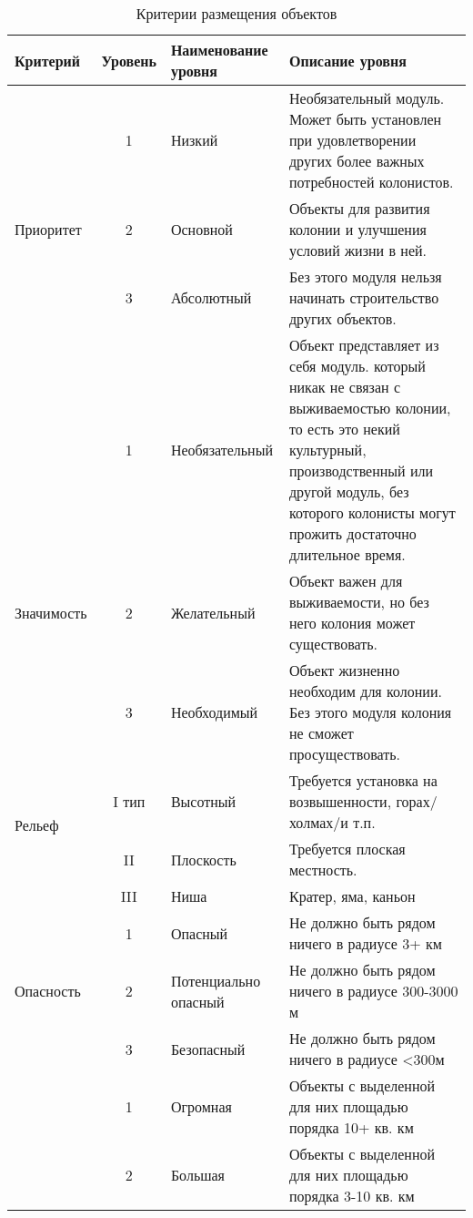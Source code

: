 
\newpage
\listoftables


%
\begin{table}[h!]
	\footnotesize
	\centering
	\caption{Критерии размещения объектов}\label{tab:criterions}
	\begin{tabular}{|p{2.2cm}|c|p{2.5cm}|p{9cm}|}
		\hline
		Критерий & Уровень & Наименование уровня & Описание уровня \\ \hline
		& 1 & Низкий & Необязательный модуль. Может быть установлен при удовлетворении других более важных потребностей колонистов. \\ \cline{2-4}
		Приоритет & 2 & Основной & Объекты для развития колонии и улучшения условий жизни в ней. \\ \cline{2-4}
		& 3 & Абсолютный & Без этого модуля нельзя начинать строительство других объектов. \\ \hline
		& 1 & Необязательный & Объект представляет из себя модуль. который никак не связан с выживаемостью колонии, то есть это некий культурный, производственный или другой модуль, без которого колонисты могут прожить достаточно длительное время. \\ \cline{2-4}
		Значимость & 2 & Желательный & Объект важен для выживаемости, но без него колония может существовать. \\ \cline{2-4}
		& 3 & Необходимый & Объект жизненно необходим для колонии. Без этого модуля колония не сможет просуществовать. \\ \hline
		\multirow{2}{*}{Рельеф} & I тип & Высотный & Требуется установка на возвышенности, горах/холмах/и т.п. \\ \cline{2-4}
		местности & II & Плоскость & Требуется плоская местность. \\ \cline{2-4}
		& III & Ниша & Кратер, яма, каньон \\ \hline
		& 1 & Опасный & Не должно быть рядом ничего в радиусе 3+ км \\ \cline{2-4}
		Опасность & 2 & Потенциально опасный & Не должно быть рядом ничего в радиусе 300-3000 м \\ \cline{2-4}
		& 3 & Безопасный & Не должно быть рядом ничего в радиусе <300м \\ \hline
		& 1 & Огромная & Объекты с выделенной для них площадью порядка 10+ кв. км \\ \cline{2-4}
		& 2 & Большая & Объекты с выделенной для них площадью порядка 3-10 кв. км \\ \cline{2-4}

\end{tabular}
\end{table}
